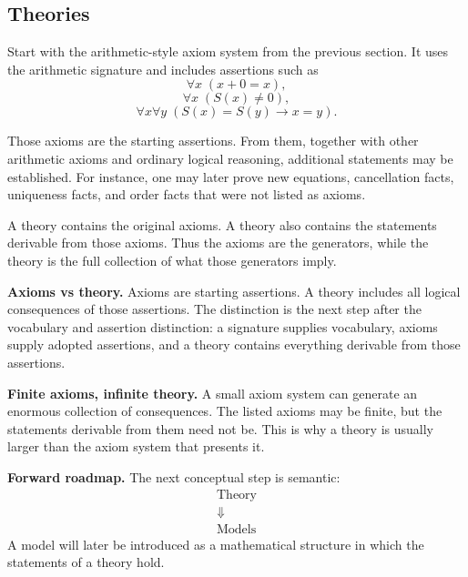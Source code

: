 \subsection*{Theories}
\label{sec:axiom-systems-theories}

\begin{tcolorbox}[colback=structuretheorybox, colframe=structuretheoryborder, arc=2pt,
  left=8pt, right=8pt, top=6pt, bottom=6pt,
  title={\small\textbf{Theory Presentation: Arithmetic Consequences}},
  fonttitle=\small\bfseries]
Start with the arithmetic-style axiom system from the previous section. It
uses the arithmetic signature and includes assertions such as
\[
  \forall x\;(x+0=x),
\]
\[
  \forall x\;(S(x)\neq 0),
\]
\[
  \forall x\forall y\;
  (S(x)=S(y)\rightarrow x=y).
\]

Those axioms are the starting assertions. From them, together with other
arithmetic axioms and ordinary logical reasoning, additional statements may be
established. For instance, one may later prove new equations, cancellation
facts, uniqueness facts, and order facts that were not listed as axioms.

A theory contains the original axioms. A theory also contains the statements
derivable from those axioms. Thus the axioms are the generators, while the
theory is the full collection of what those generators imply.
\end{tcolorbox}

\begin{remark*}
\textbf{Axioms vs theory.}
Axioms are starting assertions. A theory includes all logical consequences of
those assertions. The distinction is the next step after the vocabulary and
assertion distinction: a signature supplies vocabulary, axioms supply adopted
assertions, and a theory contains everything derivable from those assertions.

\textbf{Finite axioms, infinite theory.}
A small axiom system can generate an enormous collection of consequences. The
listed axioms may be finite, but the statements derivable from them need not
be. This is why a theory is usually larger than the axiom system that presents
it.

\textbf{Forward roadmap.}
The next conceptual step is semantic:
\[
\begin{array}{c}
\text{Theory}\\
\Downarrow\\
\text{Models}
\end{array}
\]
A model will later be introduced as a mathematical structure in which the
statements of a theory hold.
\end{remark*}

